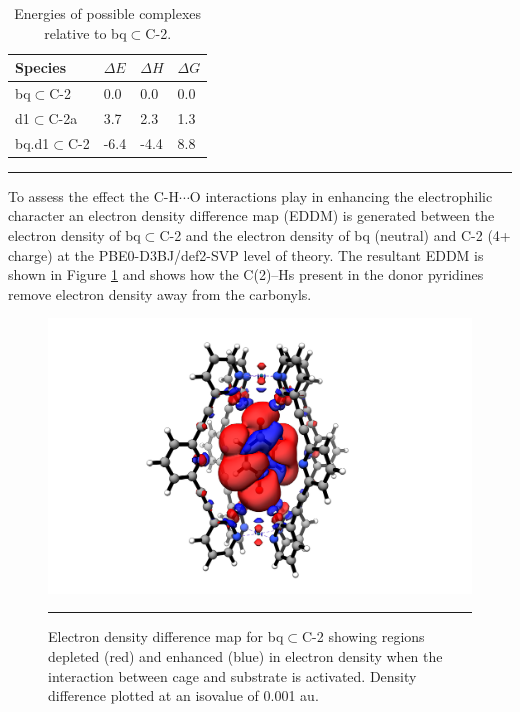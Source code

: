 \documentclass[../../main.tex]{subfiles}
\begin{document}
\begin{table}[h!]
	\def\arraystretch{1.7}
	\begin{tabularx}{\textwidth}{YYYY}
		\hline
		Species&	$\Delta E$	&$\Delta H$	&$\Delta G$
\\
		\hline
		bq$\subset$C-2	&0.0&	0.0&	0.0
\\
		d1$\subset$C-2a &3.7&	2.3	&1.3
\\
		bq.d1$\subset$C-2	&-6.4&	-4.4&	8.8
\\
		
	\end{tabularx}
	\hrule
	\vspace{0.2cm}
	\caption{Energies of possible complexes relative to bq$\subset$C-2.}
	\label{table::si_da_16}
\end{table}


To assess the effect the C-H$\cdots$O interactions play in enhancing the electrophilic character an electron density difference map (EDDM)  is generated between the electron density of bq$\subset$C-2 and the electron density of bq (neutral) and C-2 (4+ charge) at the PBE0-D3BJ/def2-SVP level of theory. The resultant EDDM is shown in Figure \ref{fig::si_da_24} and shows how the C(2)–Hs present in the donor pyridines remove electron density away from the carbonyls.

\begin{figure}[h!]
	\vspace{0.4cm}
	\centering
	\includegraphics[width=\textwidth]{3/da//figs/figS24}
	\vspace{0.2cm}
	\hrule
	\caption{Electron density difference map for bq$\subset$C-2 showing regions depleted (red) and enhanced (blue) in electron density when the interaction between cage and substrate is activated. Density difference plotted at an isovalue of 0.001 au.}
	\label{fig::si_da_24}
\end{figure}
\end{document}
